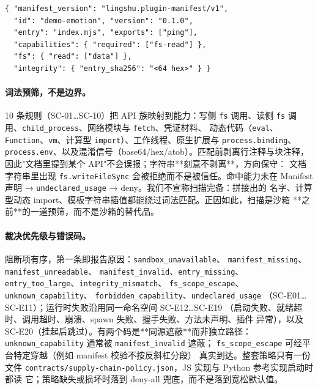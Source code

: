 {\footnotesize\begin{verbatim}
{ "manifest_version": "lingshu.plugin-manifest/v1",
  "id": "demo-emotion", "version": "0.1.0",
  "entry": "index.mjs", "exports": ["ping"],
  "capabilities": { "required": ["fs-read"] },
  "fs": { "read": ["data"] },
  "integrity": { "entry_sha256": "<64 hex>" } }
\end{verbatim}}

\paragraph{词法预筛，不是边界。}
10 条规则（SC-01\ldots SC-10）把 API 族映射到能力：写侧 \texttt{fs} 调用、读侧
\texttt{fs} 调用、\texttt{child\_process}、网络模块与 \texttt{fetch}、凭证材料、
动态代码（\texttt{eval}、\texttt{Function}、\texttt{vm}、计算型
\texttt{import}）、工作线程、原生扩展与 \texttt{process.binding}、
\texttt{process.env}、以及混淆信号（base64/hex/atob）。匹配前剥离行注释与块注释，
因此"文档里提到某个 API"不会误报；字符串**刻意不剥离**，方向保守：
文档字符串里出现 \texttt{fs.writeFileSync} 会被拒绝而不是被信任。命中能力未在
Manifest 声明 → \texttt{undeclared\_usage} → deny。我们不宣称扫描完备：拼接出的
名字、计算型动态 import、模板字符串插值都能绕过词法匹配。正因如此，扫描是沙箱
**之前**的一道预筛，而不是沙箱的替代品。

\paragraph{裁决优先级与错误码。}
阻断项有序，第一条即报告原因：\texttt{sandbox\_unavailable}、
\texttt{manifest\_missing}、\texttt{manifest\_unreadable}、
\texttt{manifest\_invalid}、\texttt{entry\_missing}、
\texttt{entry\_too\_large}、\texttt{integrity\_mismatch}、
\texttt{fs\_scope\_escape}、\texttt{unknown\_capability}、
\texttt{forbidden\_capability}、\texttt{undeclared\_usage}
（SC-E01\ldots SC-E11）；运行时失败沿用同一命名空间 SC-E12\ldots SC-E19
（启动失败、就绪超时、调用超时、崩溃、spawn 失败、握手失败、方法未声明、插件
异常），以及 SC-E20（挂起后跳过）。有两个码是**同源遮蔽**而非独立路径：
\texttt{unknown\_capability} 通常被 \texttt{manifest\_invalid} 遮蔽；
\texttt{fs\_scope\_escape} 可经平台特定穿越（例如 manifest 校验不按反斜杠分段）
真实到达。整套策略只有一份文件
\texttt{contracts/supply-chain-policy.json}，JS 实现与 Python 参考实现启动时都读
它；策略缺失或损坏时落到 deny-all 兜底，而不是落到宽松默认值。


